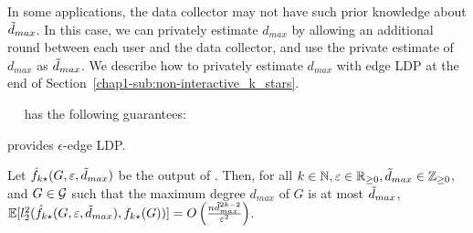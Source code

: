In some applications, the data collector may not have such prior knowledge about $\tilde{d}_{max}$. 
In this case, we can 
privately estimate $d_{max}$ by allowing an additional round between each user and the data collector, and use the private estimate of $d_{max}$ as $\tilde{d}_{max}$. 
We describe how to privately estimate $d_{max}$ with edge LDP at the end of Section~\ref{chap1-sub:non-interactive_k_stars}. 



\smallskip
{}~~ 
has the following guarantees:

\begin{theorem}\label{chap1-thm:k-stars_LDP}
  provides $\epsilon$-edge LDP.
\end{theorem}

\begin{theorem}\label{chap1-thm:k-stars}
  Let
  $\hat{f}_{k\star}(G, \varepsilon, \tilde{d}_{max})$ 
  be the output of 
  . 
  Then, 
  for all 
  $k \in \mathbb{N},\varepsilon \in \mathbb{R}_{\ge0},\tilde{d}_{max} \in \mathbb{Z}_{\ge0}$, 
  and $G \in \mathcal{G}$
  such that the maximum degree $d_{max}$ of $G$ 
  is at most 
  $\tilde{d}_{max}$, 
  $\mathbb{E}[l_2^2(\hat{f}_{k\star}(G, \varepsilon, \tilde{d}_{max}), f_{k\star}(G))] = 
  O\left( \frac{n \tilde{d}_{max}^{2k-2}}{\varepsilon^2} \right)$. 
\end{theorem}


